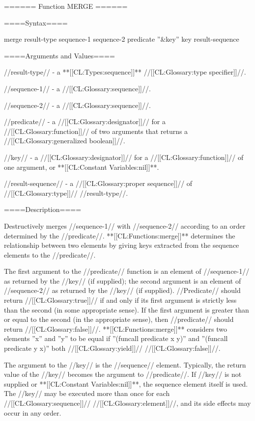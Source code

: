 ====== Function MERGE ======

====Syntax====

\DefunWithValues merge {result-type sequence-1 sequence-2 predicate ''&key'' key} {result-sequence}

====Arguments and Values====

//result-type// - a **[[CL:Types:sequence]]** //[[CL:Glossary:type specifier]]//.

//sequence-1// - a //[[CL:Glossary:sequence]]//.

//sequence-2// - a //[[CL:Glossary:sequence]]//.

//predicate// - a //[[CL:Glossary:designator]]// for a //[[CL:Glossary:function]]// of two arguments that returns a //[[CL:Glossary:generalized boolean]]//.

//key// - a //[[CL:Glossary:designator]]// for a //[[CL:Glossary:function]]// of one argument, or **[[CL:Constant Variables:nil]]**.

//result-sequence// - a //[[CL:Glossary:proper sequence]]// of //[[CL:Glossary:type]]// //result-type//.

====Description====

Destructively merges //sequence-1// with //sequence-2// according to an order determined by the //predicate//. **[[CL:Functions:merge]]** determines the relationship between two elements by giving keys extracted from the sequence elements to the //predicate//.

The first argument to the //predicate// function is an element of //sequence-1// as returned by the //key// (if supplied); the second argument is an element of //sequence-2// as returned by the //key// (if supplied). //Predicate// should return //[[CL:Glossary:true]]// if and only if its first argument is strictly less than the second (in some appropriate sense). If the first argument is greater than or equal to the second (in the appropriate sense), then //predicate// should return //[[CL:Glossary:false]]//. **[[CL:Functions:merge]]** considers two elements ''x'' and ''y'' to be equal if ''(funcall predicate x y)'' and ''(funcall predicate y x)'' both //[[CL:Glossary:yield]]// //[[CL:Glossary:false]]//.

The argument to the //key// is the //sequence// element. Typically, the return value of the //key// becomes the argument to //predicate//. If //key// is not supplied or **[[CL:Constant Variables:nil]]**, the sequence element itself is used. The //key// may be executed more than once for each //[[CL:Glossary:sequence]]// //[[CL:Glossary:element]]//, and its side effects may occur in any order.

